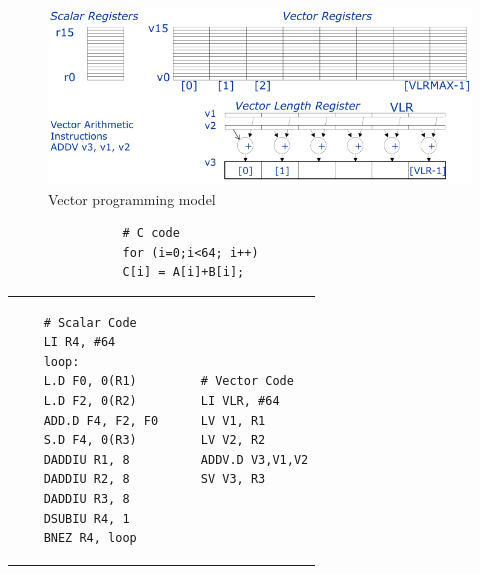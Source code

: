 \begin{figure}[h]
    \centering
    \includegraphics[scale = 0.35]{images/vector-programming-model}
    \caption{Vector programming model}
    \label{fig:vector-programming-model}
\end{figure}

\begin{table}[h]
    \begin{verbatim}
                # C code
                for (i=0;i<64; i++)
                C[i] = A[i]+B[i];
    \end{verbatim}
    \begin{tabular}{p{1.6in}|p{1.4in}}
        \begin{verbatim}
    # Scalar Code
    LI R4, #64
    loop:
    L.D F0, 0(R1)
    L.D F2, 0(R2)
    ADD.D F4, F2, F0
    S.D F4, 0(R3)
    DADDIU R1, 8
    DADDIU R2, 8
    DADDIU R3, 8
    DSUBIU R4, 1
    BNEZ R4, loop
        \end{verbatim} &
        \begin{verbatim}
    # Vector Code
    LI VLR, #64
    LV V1, R1
    LV V2, R2
    ADDV.D V3,V1,V2
    SV V3, R3
        \end{verbatim}
    \end{tabular}
    \label{tab:vector-programming-comparison}
\end{table}


